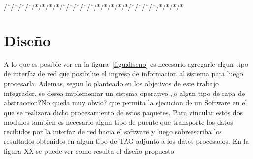/*/*/*/*/*/*/*/*/*/*/*/*/*/*/*/*/*/*/*/*/*/*/*/*/*/*
%
\section{Diseño}
A lo que es posible ver en la figura~\ref{figu:diseno} es necesario agregarle algun tipo de interfaz de red que posibilite el ingreso de informacion al sistema para luego procesarla. Ademas, segun lo planteado en los objetivos de este trabajo integrador, se desea implementar un sistema operativo ¿o algun tipo de capa de abstraccion?{No queda muy obvio?} que permita la ejecucion de un Software en el que se realizara dicho procesamiento de estos paquetes. Para vincular estos dos modulos tambien es necesario algun tipo de puente que transporte los datos recibidos por la interfaz de red hacia el software y luego sobreescriba los resultados obtenidos en algun tipo de TAG adjunto a los datos procesados. En la figura XX se puede ver como resulta el diseño propuesto

